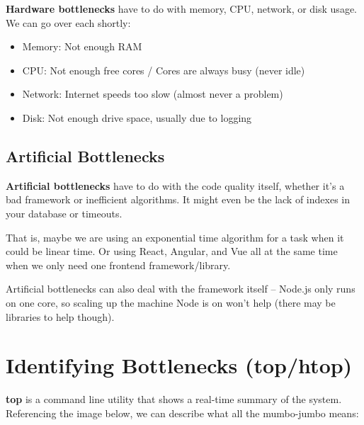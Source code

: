 \documentclass{report}
\newcommand{\npar}{\par\noindent}
\newcommand{\vpar}{\vspace{1em}\npar}
\begin{document}
\par \textbf{Hardware bottlenecks} have to do with memory, CPU, network, or disk usage. We can go over each shortly:

\begin{itemize}
    \item Memory: Not enough RAM
    \item CPU: Not enough free cores / Cores are always busy (never idle)
    \item Network: Internet speeds too slow (almost never a problem)
    \item Disk: Not enough drive space, usually due to logging
\end{itemize}

\subsection{Artificial Bottlenecks}

\par \textbf{Artificial bottlenecks} have to do with the code quality itself, whether it's a bad framework or inefficient algorithms. It might even be the lack of indexes in your database or timeouts.

\vpar That is, maybe we are using an exponential time algorithm for a task when it could be linear time. Or using React, Angular, and Vue all at the same time when we only need one frontend framework/library.

\vpar Artificial bottlenecks can also deal with the framework itself -- Node.js only runs on one core, so scaling up the machine Node is on won't help (there may be libraries to help though).

\newpage
\section{Identifying Bottlenecks (top/htop)}

\par \textbf{top} is a command line utility that shows a real-time summary of the system. Referencing the image below, we can describe what all the mumbo-jumbo means:
\end{document}
